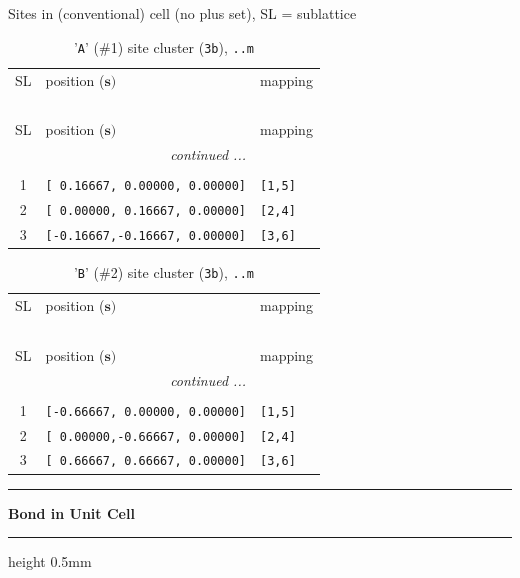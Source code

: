 \documentclass[fleqn,10pt,landscape]{jsarticle}
\begin{document}
\noindent Sites in (conventional) cell (no plus set), SL = sublattice

\renewcommand{\arraystretch}{1.6}
\begin{longtable}[l]{cll}
\captionsetup{justification=raggedright, singlelinecheck=off}
\caption{'\texttt{A}' (\#1) site cluster (\texttt{3b}), \texttt{..m}}
 \\
 \hline \hline
SL & position ($\bm{s})$ & mapping \\ \hline \endfirsthead

\multicolumn{2}{l}{\tablename\ \thetable{}} \\
 \hline \hline
SL & position ($\bm{s})$ & mapping \\ \hline \endhead

 \hline \hline
\multicolumn{2}{r}{\footnotesize\it continued ...} \\ \endfoot

 \hline \hline
\multicolumn{2}{r}{} \\ \endlastfoot

1 & \texttt{[ 0.16667, 0.00000, 0.00000]} & \texttt{[1,5]} \\ \hline
2 & \texttt{[ 0.00000, 0.16667, 0.00000]} & \texttt{[2,4]} \\ \hline
3 & \texttt{[-0.16667,-0.16667, 0.00000]} & \texttt{[3,6]} \\
\end{longtable}
\renewcommand{\arraystretch}{1.6}
\begin{longtable}[l]{cll}
\captionsetup{justification=raggedright, singlelinecheck=off}
\caption{'\texttt{B}' (\#2) site cluster (\texttt{3b}), \texttt{..m}}
 \\
 \hline \hline
SL & position ($\bm{s})$ & mapping \\ \hline \endfirsthead

\multicolumn{2}{l}{\tablename\ \thetable{}} \\
 \hline \hline
SL & position ($\bm{s})$ & mapping \\ \hline \endhead

 \hline \hline
\multicolumn{2}{r}{\footnotesize\it continued ...} \\ \endfoot

 \hline \hline
\multicolumn{2}{r}{} \\ \endlastfoot

1 & \texttt{[-0.66667, 0.00000, 0.00000]} & \texttt{[1,5]} \\ \hline
2 & \texttt{[ 0.00000,-0.66667, 0.00000]} & \texttt{[2,4]} \\ \hline
3 & \texttt{[ 0.66667, 0.66667, 0.00000]} & \texttt{[3,6]} \\
\end{longtable}
\vspace{5mm}
\noindent \rule[0.5mm]{5mm}{0.5mm}\hspace{3mm}\textbf{Bond in Unit Cell}\hspace{3mm}\leaders\hrule height 0.5mm\hfill\kern0pt
\vspace{3mm}
\end{document}

